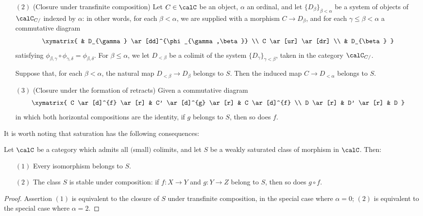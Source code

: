 \begin{CategoryTheory}
\begin{definition}
\begin{itemize}
\item[$(2)$] (Closure under transfinite composition) Let $C \in \calC$ be an object, $\alpha$
an ordinal, and let $\{ D_{\beta} \}_{\beta < \alpha} $ be a system of objects of $\calC_{C/}$
indexed by $\alpha$: in other words, for each $\beta < \alpha$, we are supplied with a morphism $C \rightarrow D_{\beta}$, and for each $\gamma \leq \beta < \alpha$ a commutative diagram
$$ \xymatrix{ & D_{\gamma} \ar[dd]^{\phi_{\gamma,\beta}} \\
C \ar[ur] \ar[dr] \\
& D_{\beta} }$$
satisfying $\phi_{\beta,\gamma} \circ \phi_{\gamma, \delta} = \phi_{\beta, \delta}.$
For $\beta \leq \alpha$, we let $D_{<\beta}$ be a colimit of the system
$\{ D_{\gamma} \}_{\gamma < \beta}$, taken in the category $\calC_{C/}$. 

Suppose that, for each $\beta < \alpha$, the natural map $D_{< \beta} \rightarrow D_{\beta}$
belongs to $S$. Then the induced map $C \rightarrow D_{<\alpha}$ belongs to $S$.

\item[$(3)$] (Closure under the formation of retracts) Given a commutative diagram
$$ \xymatrix{ C \ar[d]^{f} \ar[r] & C' \ar[d]^{g} \ar[r] & C \ar[d]^{f} \\
D \ar[r] & D' \ar[r] & D }$$
in which both horizontal compositions are the identity, if $g$ belongs to $S$, then so does $f$.
\end{itemize}
\end{definition}

It is worth noting that saturation has the following consequences:

\begin{proposition}
Let $\calC$ be a category which admits all $($small$)$ colimits, and let $S$ be a weakly saturated class of morphism in $\calC$. Then:
\begin{itemize}
\item[$(1)$] Every isomorphism belongs to $S$.
\item[$(2)$] The class $S$ is stable under composition: if $f: X \rightarrow Y$ and $g: Y \rightarrow Z$ belong to $S$, then so does $g \circ f$.
\end{itemize}
\end{proposition}

\begin{proof}
Assertion $(1)$ is equivalent to the closure of $S$ under transfinite composition, in the special case where $\alpha=0$; $(2)$ is equivalent to the special case where $\alpha=2$.
\end{proof}


\end{CategoryTheory}
